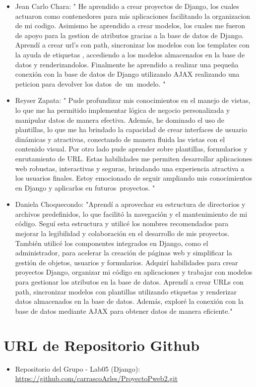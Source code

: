 \documentclass{article}
\begin{document}
\begin{itemize}
\begin{itemize}
\item Jean Carlo Chara: " He aprendido a crear proyectos de Django, los cuales actuaron como contenedores para mis aplicaciones facilitando la organizacion de mi codigo. Asimismo he aprendido a crear modelos, los cuales me fueron de apoyo para la gestion de atributos gracias a la base de datos de Django. Aprendí a crear url's con path, sincronizar los modelos con los templates con la ayuda de etiquetas {{}}, accediendo a los modelos almacenados en la base de datos y renderizandolos. Finalmente he aprendido a realizar una pequeña conexión con la base de datos de Django utilizando AJAX realizando una peticion para devolver los datos de un modelo. "

 \item Reyser Zapata: " Pude profundizar mis conocimientos en el manejo de vistas, lo que me ha permitido implementar lógica de negocio personalizada y manipular datos de manera efectiva. Además, he dominado el uso de plantillas, lo que me ha brindado la capacidad de crear interfaces de usuario dinámicas y atractivas, conectando de manera fluida las vistas con el contenido visual. Por otro lado pude aprender sobre plantillas, formularios y enrutamiento de URL. Estas habilidades me permiten desarrollar aplicaciones web robustas, interactivas y seguras, brindando una experiencia atractiva a los usuarios finales. Estoy emocionado de seguir ampliando mis conocimientos en Django y aplicarlos en futuros proyectos. "
 \item Daniela Choquecondo: "Aprendí a aprovechar su estructura de directorios y archivos predefinidos, lo que facilitó la navegación y el mantenimiento de mi código. Seguí esta estructura y utilicé los nombres recomendados para mejorar la legibilidad y colaboración en el desarrollo de mis proyectos. También utilicé los componentes integrados en Django, como el administrador, para acelerar la creación de páginas web y simplificar la gestión de objetos, usuarios y formularios. Adquirí habilidades para crear proyectos Django, organizar mi código en aplicaciones y trabajar con modelos para gestionar los atributos en la base de datos. Aprendí a crear URLs con path, sincronizar modelos con plantillas utilizando etiquetas y renderizar datos almacenados en la base de datos. Además, exploré la conexión con la base de datos mediante AJAX para obtener datos de manera eficiente."

	\end{itemize}
 
	\section{URL de Repositorio Github}
	\begin{itemize}
 \item Repositorio del Grupo - Lab05 (Django):    
\url{https://github.com/carrascoArles/ProyectoPweb2.git}
	\end{itemize}


\end{itemize}
\end{document}
